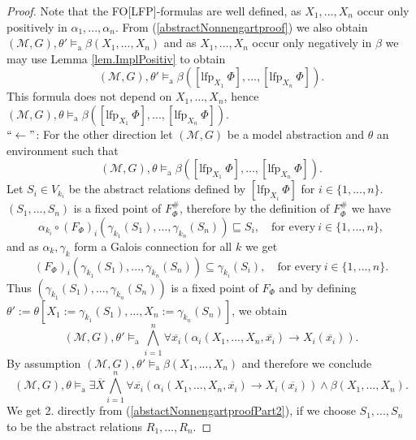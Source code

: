 \documentclass[10pt,a4paper]{amsart}
\newcommand{\calM}{\mathcal{M}}
\newcommand{\impl}{\rightarrow} %
\newcommand{\lfp}{\mathrm{lfp}} %
\newcommand{\modelsa}{\models_\mathrm{a}} %
\newcommand{\mybar}[1]{\overline{#1}}
\begin{document}
\begin{proof}
	Note that the FO[LFP]-formulas are well defined, as $X_1,...,X_n$ occur only positively in $\alpha_1,...,\alpha_n$. From (\ref{abstractNonnengartproof}) we also obtain $(\calM,G),\theta' \modelsa \beta(X_1,...,X_n)$ and as $X_1,...,X_n$ occur only negatively in $\beta$ we may use Lemma \ref{lem.ImplPositiv} to obtain
	\[
	(\calM,G),\theta' \modelsa \beta([\lfp_{X_1} ~\Phi],...,[\lfp_{X_n} ~\Phi]).
	\]
	This formula does not depend on $X_1,...,X_n$, hence$
	(\calM,G),\theta \modelsa \beta([\lfp_{X_1} ~\Phi],...,[\lfp_{X_n} ~\Phi]).
	$\\
	$``\leftarrow"$:  For the other direction let $(\calM,G)$ be a model abstraction and $\theta$ an environment such that
	\[
	(\calM,G),\theta \modelsa \beta([\lfp_{X_1} ~\Phi],...,[\lfp_{X_n} ~\Phi]).
	\]
	Let $S_i \in V_{k_i}$ be the abstract relations defined by $[\lfp_{X_i} ~\Phi]$ for $i \in \{1,...,n\}$. $(S_1,...,S_n)$ is a fixed point of $F_{\Phi}^{\#}$, therefore by the definition of $F_{\Phi}^{\#}$ we have 
	\[
	\alpha_{k_i} \circ (F_{\Phi})_i(\gamma_{k_1}(S_1),...,\gamma_{k_n}(S_n)) \sqsubseteq S_i, \quad \text{for every}~ i \in \{1,...,n\},
	\]
	and as $\alpha_k,\gamma_k$ form a Galois connection for all $k$ we get 
	\[
	(F_{\Phi})_i(\gamma_{k_1}(S_1),...,\gamma_{k_n}(S_n)) \subseteq \gamma_{k_i}(S_i), \quad \text{for every}~ i \in \{1,...,n\}.
	\]
	Thus $(\gamma_{k_1}(S_1),...,\gamma_{k_n}(S_n))$ is a fixed point of $F_{\Phi}$ and by defining $\theta' := \theta[X_1 := \gamma_{k_1}(S_1),...,X_n := \gamma_{k_n}(S_n)]$, we obtain
	\[
	(\calM,G),\theta' \modelsa \bigwedge_{i=1}^n \forall \mybar{x_i} \left(\alpha_i(X_1,...,X_n,\mybar{x_i}) \impl X_i(\mybar{x_i})\right).
	\]
	By assumption $(\calM,G),\theta' \modelsa \beta(X_1,...,X_n)$ and therefore we conclude
	\[
	(\calM,G),\theta \modelsa \exists \mybar{X} \bigwedge_{i=1}^n \forall \mybar{x_i} \left(\alpha_i(X_1,...,X_n,\mybar{x_i}) \impl X_i(\mybar{x_i})\right) \wedge \beta(X_1,...,X_n).
	\]
	We get 2. directly from (\ref{abstactNonnengartproofPart2}), if we choose $S_1,...,S_n$  to be the abstract relations $R_1,...,R_n$.
\end{proof}
\end{document}

